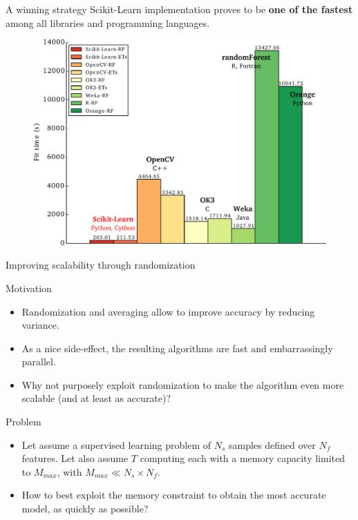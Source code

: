 \documentclass{beamer}
\begin{document}
\begin{frame}{A winning strategy}
Scikit-Learn implementation proves to be {\bf one of the fastest} among all libraries and programming languages.
  \begin{figure}
  \includegraphics[scale=0.5]{./figures/bench.pdf}
  \end{figure}
\end{frame}

\begin{frame}{Improving scalability through randomization}

\begin{block}{Motivation}
\begin{itemize}
\item Randomization and averaging allow to improve accuracy by reducing variance.
\item As a nice side-effect, the resulting algorithms are fast and
  embarrassingly parallel.
\item Why not purposely exploit randomization to make the algorithm
  even more scalable (and at least as accurate)?
\end{itemize}
\end{block}

\begin{block}{Problem}
\begin{itemize}
\item Let assume a supervised learning problem of $N_s$ samples defined over $N_f$ features.
Let also assume $T$ computing each with a
  memory capacity limited to $M_{max}$, with $M_{max}\ll N_s \times N_f$.
\item How to best exploit the memory constraint to obtain the most accurate model, as quickly as possible?
\end{itemize}
\end{block}

\end{frame}
\end{document}
